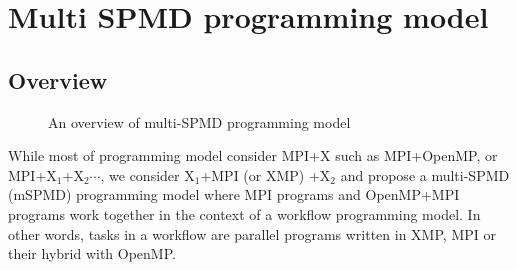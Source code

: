 \documentclass[graybox]{svmult}
\begin{document}
\section{Multi SPMD programming model}
\label{section:multi spmd programming model}

\subsection{Overview}

\begin{figure}[t]
 \begin{center}
\caption{An overview of multi-SPMD programming model}
\label{figure:overview of mSPMD}
 \end{center}
\end{figure}

While most of programming model consider MPI+X such as MPI+OpenMP,  or MPI+X$_{1}$+X$_{2}\cdots $, we consider X$_{1}$+MPI (or XMP) +X$_{2}$ and propose a multi-SPMD (mSPMD) programming model where MPI programs and OpenMP+MPI programs work together in the context of a workflow programming model. In other words, tasks in a workflow are parallel programs written in XMP, MPI or their hybrid with OpenMP. 
\end{document}
